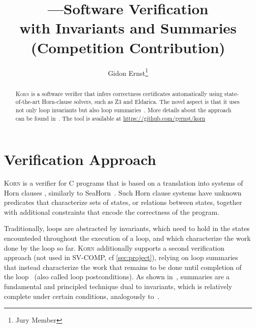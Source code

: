\documentclass{llncs}
\author{Gidon Ernst\thanks{Jury Member}}
\title{\Korn---Software Verification \\ with Invariants and Summaries \\ (Competition Contribution)}
\institute{LMU Munich \\ \mailto{gidon.ernst@lmu.de}}
\newcommand{\Korn}{\textsc{Korn}\xspace}
\begin{document}
\maketitle

\begin{abstract}
    \Korn is a software verifier that infers correctness certificates automatically using state-of-the-art Horn-clause solvers, such as Z3 and Eldarica.
    The novel aspect is that it uses not only loop invariants but also loop summaries~\cite{hehner1999refinement,hehner2005specified,tuerk2010local}.
    More details about the approach can be found in~\cite{ernst:arxiv2020:summaries}.
    The tool is available at \url{https://github.com/gernst/korn}
    

\end{abstract}

\section{Verification Approach}
\label{sec:approach}

\Korn is a verifier for C programs that is based on a translation into systems of Horn clauses
\cite{bjorner2015horn,gurfinkel2019science}, similarly to SeaHorn~\cite{gurfinkel2015seahorn}.
Such Horn clause systems have unknown predicates that characterize sets of states,
or relations between states, together with additional constraints that encode the correctness of the program.

Traditionally, loops are abstracted by invariants, which need to hold in the states
encounteded throughout the execution of a loop, and which characterize the work done by the loop so far.
\Korn additionally supports a second verification approach (not used in SV-COMP, cf \cref{sec:project}), relying on loop summaries that instead characterize
the work that remains to be done until completion of the loop~\cite{hehner1999refinement,tuerk2010local,hehner2005specified}
(also called loop postconditions).
As shown in~\cite{ernst:arxiv2020:summaries}, summaries are a fundamental and principled technique dual to invariants,
which is relatively complete under certain conditions, analogously to~\cite{hoare1969axiomatic}.
\end{document}

